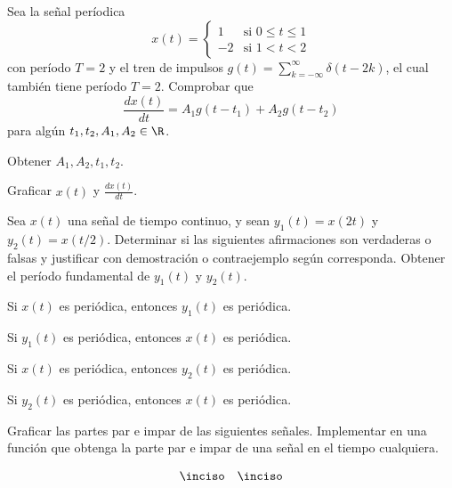\begin{ejercicio}
    Sea la señal períodica
    \begin{equation*}
        x(t) = \begin{cases}
            1 & \mbox{si } 0 \leq t \leq 1 \\
            -2 & \mbox{si } 1 < t < 2 
        \end{cases}
    \end{equation*}
    con período $T=2$ y el tren de impulsos $g(t) = \sum_{k=-\infty}^{\infty} \delta(t-2k)$, el cual también tiene período $T=2$. Comprobar que
    \begin{equation*}
        \frac{dx(t)}{dt} = A_1 g(t-t_1) + A_2 g(t-t_2)
    \end{equation*}
    para algún $t_1, t_2, A_1, A_2 \in \R$. 
    
    \inciso Obtener $A_1, A_2, t_1, t_2$.

    \inciso Graficar $x(t)$ y $\frac{dx(t)}{dt}$.   
\end{ejercicio}


\begin{ejercicio}
    Sea $x(t)$ una señal de tiempo continuo, y sean $y_1(t) = x(2 t)$ y $y_2(t) = x(t / 2)$. Determinar si las siguientes afirmaciones son verdaderas o falsas y justificar con demostración o contraejemplo según corresponda. Obtener el período fundamental de $y_1(t)$ y $y_2(t)$.
    
    \inciso Si $x(t)$ es periódica, entonces $y_1(t)$ es periódica.
    
    \inciso Si $y_1(t)$ es periódica, entonces $x(t)$ es periódica.
    
    \inciso Si $x(t)$ es periódica, entonces $y_2(t)$ es periódica.
    
    \inciso Si $y_2(t)$ es periódica, entonces $x(t)$ es periódica.
    
\end{ejercicio}

\begin{ejercicio}
    Graficar las partes par e impar de las siguientes señales. Implementar en \Keyboardsym una función que obtenga la parte par e impar de una señal en el tiempo cualquiera. 
    
    \begin{align*}
    \inciso \parbox{.3\textwidth}{} & \hfill & \inciso \parbox{.3\textwidth}{}
    \end{align*}
\end{ejercicio}

